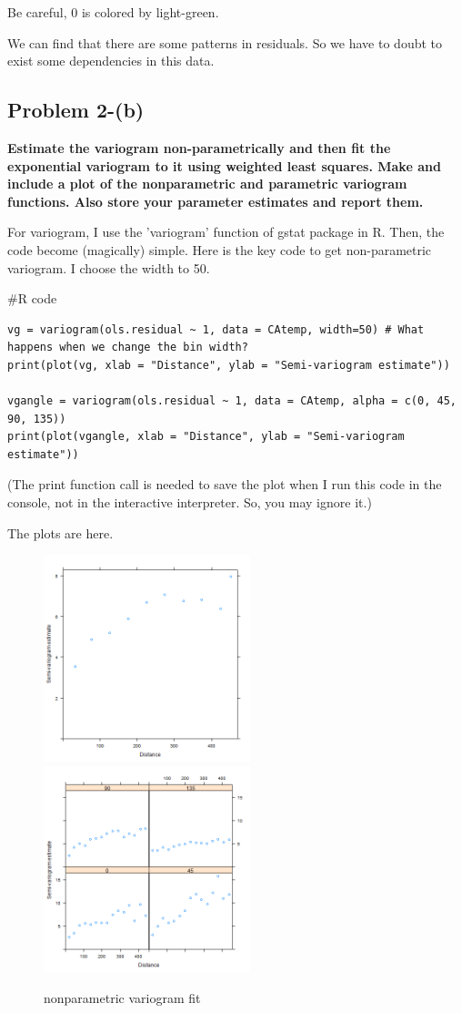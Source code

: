 \documentclass{article}
\newenvironment{Rcode}%
{%
    \begin{mdframed}
    \#R code
    \begin{small}
}
{%
    \end{small}
    \end{mdframed}
}
\begin{document}
Be careful, 0 is colored by light-green.

We can find that there are some patterns in residuals. So we have to doubt to exist some dependencies in this data.


\clearpage
\subsection{Problem 2-(b)}
\textbf{
Estimate the variogram non-parametrically and then fit the exponential variogram to it using weighted least squares.
Make and include a plot of the nonparametric and parametric variogram functions.
Also store your parameter estimates and report them.
}

For variogram, I use the 'variogram' function of gstat package in R. Then, the code become (magically) simple.
Here is the key code to get non-parametric variogram. I choose the width to 50.

\begin{Rcode}
    \begin{verbatim}
vg = variogram(ols.residual ~ 1, data = CAtemp, width=50) # What happens when we change the bin width?
print(plot(vg, xlab = "Distance", ylab = "Semi-variogram estimate"))

vgangle = variogram(ols.residual ~ 1, data = CAtemp, alpha = c(0, 45, 90, 135))
print(plot(vgangle, xlab = "Distance", ylab = "Semi-variogram estimate"))
    \end{verbatim}
\end{Rcode}
(The print function call is needed to save the plot when I run this code in the console, not in the interactive interpreter.
So, you may ignore it.)

The plots are here. 
\begin{figure}[!h]
    \centering
    \includegraphics[height=6cm]{prob2_CAtemp_variogram.png}
    \includegraphics[height=6cm]{prob2_CAtemp_variogram_angle.png}
    \caption{nonparametric variogram fit}
\end{figure}
\end{document}
